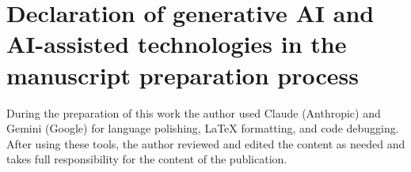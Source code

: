 \documentclass[a4paper,fleqn]{cas-sc}
\begin{document}








\FloatBarrier
\section*{Declaration of generative AI and AI-assisted technologies in the manuscript preparation process}
During the preparation of this work the author used Claude (Anthropic) and Gemini (Google) for language polishing, LaTeX formatting, and code debugging. After using these tools, the author reviewed and edited the content as needed and takes full responsibility for the content of the publication.
\end{document}
